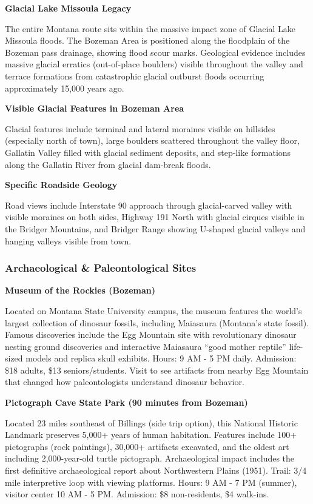 \documentclass[
  11pt,
  letterpaper,
  DIV=10,
  numbers=noendperiod]{scrartcl}
\begin{document}
\textbf{Glacial Lake Missoula Legacy}

The entire Montana route sits within the massive impact zone of Glacial
Lake Missoula floods. The Bozeman Area is positioned along the
floodplain of the Bozeman pass drainage, showing flood scour marks.
Geological evidence includes massive glacial erratics (out-of-place
boulders) visible throughout the valley and terrace formations from
catastrophic glacial outburst floods occurring approximately 15,000
years ago.

\textbf{Visible Glacial Features in Bozeman Area}

Glacial features include terminal and lateral moraines visible on
hillsides (especially north of town), large boulders scattered
throughout the valley floor, Gallatin Valley filled with glacial
sediment deposits, and step-like formations along the Gallatin River
from glacial dam-break floods.

\textbf{Specific Roadside Geology}

Road views include Interstate 90 approach through glacial-carved valley
with visible moraines on both sides, Highway 191 North with glacial
cirques visible in the Bridger Mountains, and Bridger Range showing
U-shaped glacial valleys and hanging valleys visible from town.

\subsubsection{Archaeological \& Paleontological
Sites}\label{archaeological-paleontological-sites}

\textbf{Museum of the Rockies (Bozeman)}

Located on Montana State University campus, the museum features the
world's largest collection of dinosaur fossils, including Maiasaura
(Montana's state fossil). Famous discoveries include the Egg Mountain
site with revolutionary dinosaur nesting ground discoveries and
interactive Maiasaura ``good mother reptile'' life-sized models and
replica skull exhibits. Hours: 9 AM - 5 PM daily. Admission: \$18
adults, \$13 seniors/students. Visit to see artifacts from nearby Egg
Mountain that changed how paleontologists understand dinosaur behavior.

\textbf{Pictograph Cave State Park (90 minutes from Bozeman)}

Located 23 miles southeast of Billings (side trip option), this National
Historic Landmark preserves 5,000+ years of human habitation. Features
include 100+ pictographs (rock paintings), 30,000+ artifacts excavated,
and the oldest art including 2,000-year-old turtle pictograph.
Archaeological impact includes the first definitive archaeological
report about Northwestern Plains (1951). Trail: 3/4 mile interpretive
loop with viewing platforms. Hours: 9 AM - 7 PM (summer), visitor center
10 AM - 5 PM. Admission: \$8 non-residents, \$4 walk-ins.
\end{document}
